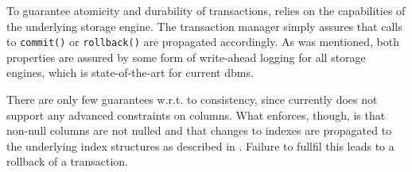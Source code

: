 To guarantee atomicity and durability of transactions, \cottontail{} relies on the capabilities of the underlying storage engine. The transaction manager simply assures that calls to \texttt{commit()} or \texttt{rollback()} are propagated accordingly. As was mentioned, both properties are assured by some form of write-ahead logging for all storage engines, which is state-of-the-art for current \acrshort{dbms}.

There are only few guarantees w.r.t. to consistency, since \cottontail{} currently does not support any advanced constraints on columns. What \cottontail{} enforces, though, is that non-null columns are not nulled and that changes to indexes are propagated to the underlying index structures as described in . Failure to fullfil this leads to a rollback of a transaction.